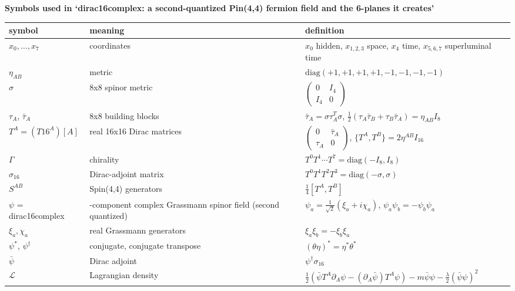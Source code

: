 \documentclass[10pt]{article}
\begin{document}
{\raggedright\LARGE\bfseries Symbols used in `dirac16complex: a second-quantized Pin(4,4) fermion field and the 6-planes it creates'\par}\medskip

{\small\begin{longtable}{>{\raggedright\arraybackslash}p{}>{\raggedright\arraybackslash}p{}>{\raggedright\arraybackslash}p{}}\toprule
symbol & meaning & definition \\\midrule\endhead
\bottomrule\endfoot
$x_0,\dots,x_7$ & coordinates & $x_0$ hidden, $x_{1,2,3}$ space, $x_4$ time, $x_{5,6,7}$ superluminal time \\
$\eta_{AB}$ & metric & $\mathrm{diag}(+1,+1,+1,+1,-1,-1,-1,-1)$ \\
$\sigma$ & 8x8 spinor metric & $\begin{pmatrix}0&I_4\\ I_4&0\end{pmatrix}$ \\
$\tau_A$, $\bar\tau_A$ & 8x8 building blocks & $\bar\tau_A=\sigma\tau_A^T\sigma$, $\frac12(\tau_A\bar\tau_B+\tau_B\bar\tau_A)=\eta_{AB}I_8$ \\
$T^A=(T16^A)[A]$ & real 16x16 Dirac matrices & $\begin{pmatrix}0&\bar\tau_A\\ \tau_A&0\end{pmatrix}$, $\{T^A,T^B\}=2\eta^{AB}I_{16}$ \\
$\Gamma$ & chirality & $T^0T^1\cdots T^7=\mathrm{diag}(-I_8,I_8)$ \\
$\sigma_{16}$ & Dirac-adjoint matrix & $T^0T^1T^2T^3=\mathrm{diag}(-\sigma,\sigma)$ \\
$S^{AB}$ & Spin(4,4) generators & $\frac14[T^A,T^B]$ \\
$\psi$ = dirac16complex & 16-component complex Grassmann spinor field (second quantized) & $\psi_a = \frac1{\sqrt2}(\xi_a + i\chi_a)$, $\psi_a\psi_b=-\psi_b\psi_a$ \\
$\xi_a,\chi_a$ & real Grassmann generators & $\xi_a\xi_b = -\xi_b\xi_a$ \\
$\psi^*$, $\psi^\dagger$ & conjugate, conjugate transpose & $(\theta\eta)^*=\eta^*\theta^*$ \\
$\bar\psi$ & Dirac adjoint & $\psi^\dagger\sigma_{16}$ \\
$\mathcal L$ & Lagrangian density & $\frac12(\bar\psi T^A\partial_A\psi-(\partial_A\bar\psi)T^A\psi) - m\bar\psi\psi - \frac\lambda2(\bar\psi\psi)^2$ \\

\end{longtable}}
\end{document}
